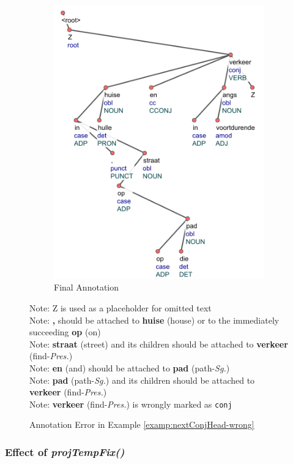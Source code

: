 \begin{figure}[H]
\begin{subfigure}{.5\textwidth}
    \includegraphics[scale=0.69]{img/nextConjHead-wrong2.png}
     \caption{Final Annotation}
    \end{subfigure}
    \caption{Annotation Error in Example \ref{examp:nextConjHead-wrong}}
    Note: Z is used as a placeholder for omitted text\\
    Note: \textbf{,} should be attached to \textbf{huise} (house) or to the immediately succeeding \textbf{op} (on)\\
    Note: \textbf{straat} (street) and its children should be attached to \textbf{verkeer} (find-\textit{Pres.})\\
    Note: \textbf{en} (and) should be attached to \textbf{pad} (path-\textit{Sg.}) \\
    Note: \textbf{pad} (path-\textit{Sg.}) and its children should be attached to \textbf{verkeer} (find-\textit{Pres.})\\
    Note: \textbf{verkeer} (find-\textit{Pres.}) is wrongly marked as \verb|conj|
    \label{fig:nextConjHead-wrong}
\end{figure}

\subsubsection{Effect of \textit{projTempFix()}}

